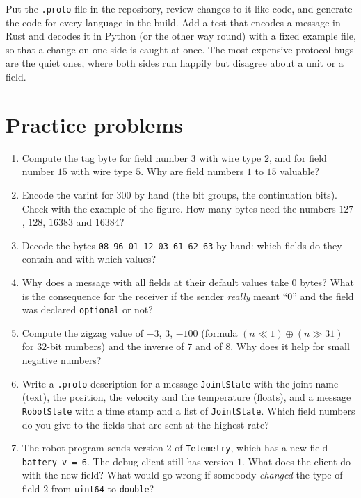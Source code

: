 \begin{aibox}
Put the \texttt{.proto} file in the repository, review changes to it like code, and generate the code for every language in the build. Add a test that encodes a message in Rust and decodes it in Python (or the other way round) with a fixed example file, so that a change on one side is caught at once. The most expensive protocol bugs are the quiet ones, where both sides run happily but disagree about a unit or a field.
\end{aibox}

\section*{Practice problems}
\begin{enumerate}[label=\textbf{\thechapter.\arabic*}]
  \item Compute the tag byte for field number $3$ with wire type $2$, and for field number $15$ with wire type $5$. Why are field numbers $1$ to $15$ valuable?
  \item Encode the varint for $300$ by hand (the bit groups, the continuation bits). Check with the example of the figure. How many bytes need the numbers $127$, $128$, $16383$ and $16384$?
  \item Decode the bytes \verb!08 96 01 12 03 61 62 63! by hand: which fields do they contain and with which values?
  \item Why does a message with all fields at their default values take $0$ bytes? What is the consequence for the receiver if the sender \emph{really} meant ``$0$'' and the field was declared \verb!optional! or not?
  \item Compute the zigzag value of $-3$, $3$, $-100$ (formula $(n\ll1)\oplus(n\gg31)$ for $32$-bit numbers) and the inverse of $7$ and of $8$. Why does it help for small negative numbers?
  \item Write a \verb!.proto! description for a message \verb!JointState! with the joint name (text), the position, the velocity and the temperature (floats), and a message \verb!RobotState! with a time stamp and a list of \verb!JointState!. Which field numbers do you give to the fields that are sent at the highest rate?
  \item The robot program sends version $2$ of \verb!Telemetry!, which has a new field \verb!battery_v = 6!. The debug client still has version $1$. What does the client do with the new field? What would go wrong if somebody \emph{changed} the type of field $2$ from \verb!uint64! to \verb!double!?

\end{enumerate}
